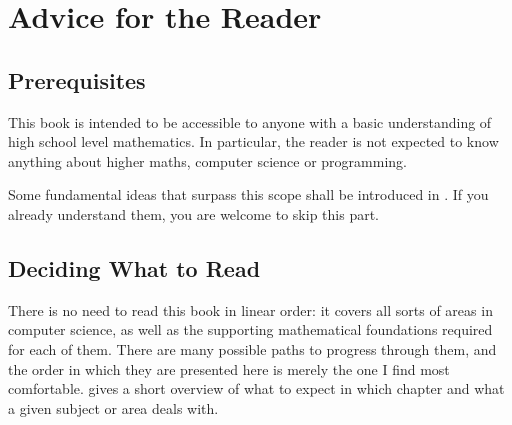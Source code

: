 \chapter{Advice for the Reader}

\section{Prerequisites}
This book is intended to be accessible to anyone with a basic understanding of
high school level mathematics.
In particular, the reader is not expected to know anything about higher maths,
computer science or programming.

Some fundamental ideas that surpass this scope shall be introduced in
. If you already understand them,
you are welcome to skip this part.

\section{Deciding What to Read}
There is no need to read this book in linear order:
it covers all sorts of areas in computer science, as well as the supporting
mathematical foundations required for each of them. There are many possible
paths to progress through them, and the order in which they are presented here
is merely the one I find most comfortable.  gives a short
overview of what to expect in which chapter and what a given subject or area
deals with.


